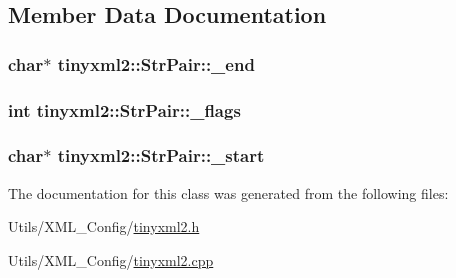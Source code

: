 \subsection{Member Data Documentation}
\hypertarget{classtinyxml2_1_1_str_pair_a855c81f785458d8f84313221f2d4a1eb}{
\subsubsection[{\-\_\-end}]{\setlength{\rightskip}{0pt plus 5cm}char$\ast$ tinyxml2\-::\-Str\-Pair\-::\-\_\-end\hspace{0.3cm}{\ttfamily [private]}}}\label{classtinyxml2_1_1_str_pair_a855c81f785458d8f84313221f2d4a1eb}
\hypertarget{classtinyxml2_1_1_str_pair_ae6fabc08e7b24b0d41fa5f2fadbda4ed}{
\subsubsection[{\-\_\-flags}]{\setlength{\rightskip}{0pt plus 5cm}int tinyxml2\-::\-Str\-Pair\-::\-\_\-flags\hspace{0.3cm}{\ttfamily [private]}}}\label{classtinyxml2_1_1_str_pair_ae6fabc08e7b24b0d41fa5f2fadbda4ed}
\hypertarget{classtinyxml2_1_1_str_pair_acfd8687916a02833cc55c279460d2f4a}{
\subsubsection[{\-\_\-start}]{\setlength{\rightskip}{0pt plus 5cm}char$\ast$ tinyxml2\-::\-Str\-Pair\-::\-\_\-start\hspace{0.3cm}{\ttfamily [private]}}}\label{classtinyxml2_1_1_str_pair_acfd8687916a02833cc55c279460d2f4a}


The documentation for this class was generated from the following files\-:\begin{DoxyCompactItemize}
\item 
Utils/\-X\-M\-L\-\_\-\-Config/\hyperlink{tinyxml2_8h}{tinyxml2.\-h}\item 
Utils/\-X\-M\-L\-\_\-\-Config/\hyperlink{tinyxml2_8cpp}{tinyxml2.\-cpp}\end{DoxyCompactItemize}
